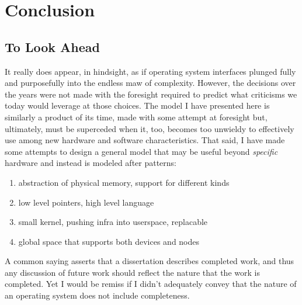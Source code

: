 
\chapter{Conclusion}\label{ch:conclusion}


\section{To Look Ahead}



It really does appear, in hindsight, as if operating system interfaces plunged fully and purposefully into the endless maw of
complexity. However, the decisions over the years were not made with the foresight required to predict what criticisms
we today would leverage at those choices. The model I have presented here is similarly a product of its time, made with
some attempt at foresight but, ultimately, must be superceded when it, too, becomes too unwieldy to effectively use
among new hardware and software characteristics. That said, I have made some attempts to design a general model that
may be useful beyond \emph{specific} hardware and instead is modeled after patterns:

\begin{enumerate}
    \item abstraction of physical memory, support for different kinds
    \item low level pointers, high level language
    \item small kernel, pushing infra into userspace, replacable
    \item global space that supports both devices and nodes
\end{enumerate}


A common saying asserts that a dissertation describes completed work, and thus any discussion of future work should reflect
the nature that the work is completed. Yet I would be remiss if I didn't adequately convey that the nature of an
operating system does not include completeness.




